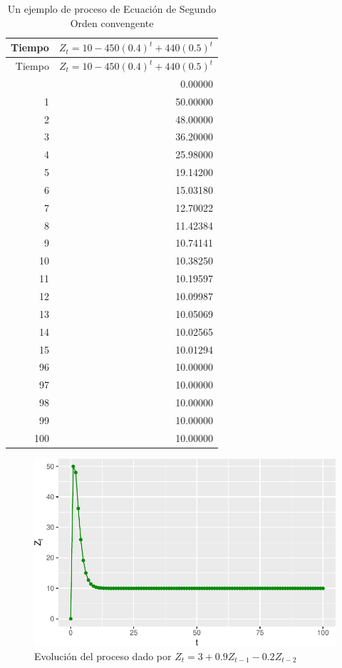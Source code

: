 \documentclass[
  a4paper,
]{article}
\begin{document}
\begin{longtable}[]{@{}rr@{}}
\caption{Un ejemplo de proceso de Ecuación de Segundo Orden
convengente}\tabularnewline
\toprule\noalign{}
Tiempo & \(Z_t =10-450(0.4)^t+440(0.5)^t\) \\
\midrule\noalign{}
\endfirsthead
\toprule\noalign{}
Tiempo & \(Z_t =10-450(0.4)^t+440(0.5)^t\) \\
\midrule\noalign{}
\endhead
\bottomrule\noalign{}
\endlastfoot
0 & 0.00000 \\
1 & 50.00000 \\
2 & 48.00000 \\
3 & 36.20000 \\
4 & 25.98000 \\
5 & 19.14200 \\
6 & 15.03180 \\
7 & 12.70022 \\
8 & 11.42384 \\
9 & 10.74141 \\
10 & 10.38250 \\
11 & 10.19597 \\
12 & 10.09987 \\
13 & 10.05069 \\
14 & 10.02565 \\
15 & 10.01294 \\
96 & 10.00000 \\
97 & 10.00000 \\
98 & 10.00000 \\
99 & 10.00000 \\
100 & 10.00000 \\
\end{longtable}

\begin{figure}

\caption{Evolución del proceso dado por
\(Z_t =3+0.9Z_{t-1}-0.2Z_{t-2}\)}

{\centering \includegraphics{index_files/figure-pdf/fig23-1.pdf}

}

\end{figure}
\end{document}
